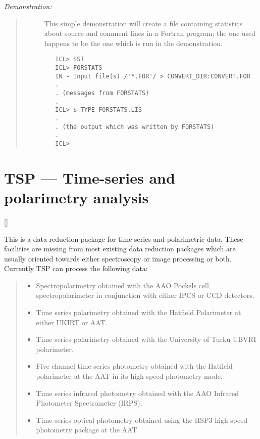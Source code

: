 {\em Demonstration:}\hfill
\begin{quote}
\begin{description}
\item [] This simple demonstration will create a file containing statistics
about source and comment lines in a Fortran program; the one used happens to
be the one which is run in the demonstration.

\begin{small}
\begin{verbatim}
   ICL> SST
   ICL> FORSTATS
   IN - Input file(s) /'*.FOR'/ > CONVERT_DIR:CONVERT.FOR
   .
   . (messages from FORSTATS)
   .
   ICL> $ TYPE FORSTATS.LIS
   .
   . (the output which was written by FORSTATS)
   .
   ICL>
\end{verbatim}
\end{small}

\end{description}
\end{quote}

\newpage

\section{TSP --- Time-series and polarimetry analysis} 

\vspace{-11mm}

\hfill []

\vspace{5mm}

This is a data reduction package for time-series and polarimetric data.
These facilities are missing from most existing data reduction packages which
are usually oriented towards either spectroscopy or image processing or both.
Currently TSP can process the following data:

{\small
\begin{quote}
\begin{itemize}
\item Spectropolarimetry obtained with the AAO Pockels cell
 spectropolarimeter in conjunction with either IPCS or CCD detectors.
\item Time series polarimetry obtained with the Hatfield Polarimeter
 at either UKIRT or AAT.
\item Time series polarimetry obtained with the University of Turku
 UBVRI polarimeter.
\item Five channel time series photometry obtained with the Hatfield
 polarimeter at the AAT in its high speed photometry mode.
\item Time series infrared photometry obtained with the AAO Infrared
 Photometer Spectrometer (IRPS).
\item Time series optical photometry obtained using the HSP3 high speed
photometry package at the AAT.
\end{itemize}
\end{quote}
}

